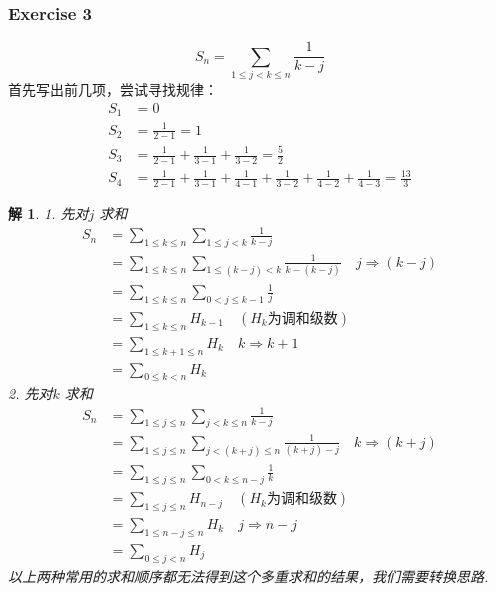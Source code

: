 \documentclass[mode=geye, chinesefont=founder]{elegantnote}
\newtheorem{solve}{解}
\begin{document}
\subsubsection{Exercise 3}
\begin{equation*}
    S_n = \sum_{1\leqslant j < k\leqslant n}\frac{1}{k-j}
\end{equation*}
首先写出前几项，尝试寻找规律：
\begin{align*}
    S_1 &= 0\\
    S_2 &= \frac{1}{2-1} = 1\\
    S_3 &= \frac{1}{2-1}+\frac{1}{3-1}+\frac{1}{3-2} = \frac{5}{2}\\
    S_4 &= \frac{1}{2-1}+\frac{1}{3-1}+\frac{1}{4-1}+\frac{1}{3-2}+\frac{1}{4-2}+\frac{1}{4-3} = \frac{13}{3}
\end{align*}
\begin{solve}
    1. 先对$ j $ 求和
    \begin{align*}
        S_n 
        &= \sum_{1\leqslant k \leqslant n} \sum_{1\leqslant j < k}\frac{1}{k-j}\\
        &= \sum_{1\leqslant k \leqslant n} \sum_{1\leqslant (k-j) < k}\frac{1}{k-(k-j)} \quad j\Rightarrow (k-j) \\
        &= \sum_{1\leqslant k \leqslant n} \sum_{0<j\leqslant k-1}\frac{1}{j} \\
        &= \sum_{1\leqslant k \leqslant n} H_{k-1} \quad(H_k\text{为调和级数})\\
        &= \sum_{1\leqslant k+1 \leqslant n} H_{k}\quad k\Rightarrow k+1 \\
        &= \sum_{0\leqslant k < n} H_{k}
    \end{align*}
    2. 先对$ k $ 求和
    \begin{align*}
        S_n 
        &= \sum_{1\leqslant j \leqslant n} \sum_{j < k\leqslant n}\frac{1}{k-j}\\
        &= \sum_{1\leqslant j \leqslant n} \sum_{j < (k+j)\leqslant n}\frac{1}{(k+j)-j} \quad k\Rightarrow (k+j) \\
        &= \sum_{1\leqslant j \leqslant n} \sum_{0<k\leqslant n-j}\frac{1}{k} \\
        &= \sum_{1\leqslant j \leqslant n} H_{n-j} \quad(H_k\text{为调和级数})\\
        &= \sum_{1\leqslant n-j \leqslant n} H_{k}\quad j\Rightarrow n-j \\
        &= \sum_{0\leqslant j < n} H_{j}
    \end{align*}
    以上两种常用的求和顺序都无法得到这个多重求和的结果，我们需要转换思路.


\end{solve}
\end{document}
